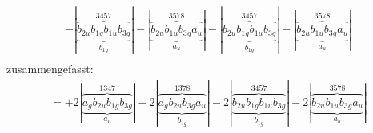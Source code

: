 \documentclass{article}
\begin{document}
\begin{multline*}
-\left|\underbrace{\overbrace{b_{2u} b_{1g} b_{1u} b_{3g}}^{3 4 5 7}}_{b_{1g}}\right|-\left|\underbrace{\overbrace{b_{2u} b_{1u} b_{3g} a_{u}}^{3 5 7 8}}_{a_{u}}\right|-\left|\underbrace{\overbrace{b_{2u} b_{1g} b_{1u} b_{3g}}^{3 4 5 7}}_{b_{1g}}\right|-\left|\underbrace{\overbrace{b_{2u} b_{1u} b_{3g} a_{u}}^{3 5 7 8}}_{a_{u}}\right|\\
\end{multline*}zusammengefasst:\begin{multline*}
=+2\left|\underbrace{\overbrace{a_{g} b_{2u} b_{1g} b_{3g}}^{1 3 4 7}}_{a_{u}}\right|-2\left|\underbrace{\overbrace{a_{g} b_{2u} b_{3g} a_{u}}^{1 3 7 8}}_{b_{1g}}\right|-2\left|\underbrace{\overbrace{b_{2u} b_{1g} b_{1u} b_{3g}}^{3 4 5 7}}_{b_{1g}}\right|-2\left|\underbrace{\overbrace{b_{2u} b_{1u} b_{3g} a_{u}}^{3 5 7 8}}_{a_{u}}\right|\\
\end{multline*}\\ \\
\vspace{0.5cm}
\end{document}
